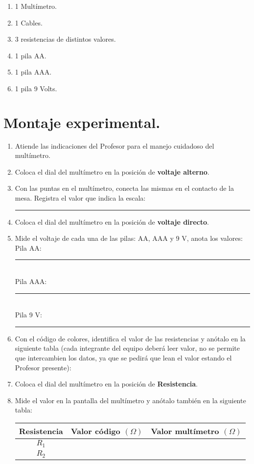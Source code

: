 \documentclass[14pt]{extarticle}
\begin{document}
\begin{enumerate}[label=\roman*)]
\item 1 Multímetro.
\item 1 Cables.
\item 3 resistencias de distintos valores.
\item 1 pila AA.
\item 1 pila AAA.
\item 1 pila 9 Volts.
\end{enumerate}

\section{Montaje experimental.}

\begin{enumerate}
\item Atiende las indicaciones del Profesor para el manejo cuidadoso del multímetro.
\item Coloca el dial del multímetro en la posición de \textbf{voltaje alterno}.
\item Con las puntas en el multímetro, conecta las mismas en el contacto de la mesa. Registra el valor que indica la escala: \rule{2cm}{0.1mm}
\item Coloca el dial del multímetro en la posición de \textbf{voltaje directo}.
\item Mide el voltaje de cada una de las pilas: AA, AAA y 9 V, anota los valores: \\
Pila AA: \rule{2cm}{0.1mm} \\
Pila AAA: \rule{2cm}{0.1mm} \\
Pila 9 V: \rule{2cm}{0.1mm}
\item Con el código de colores, identifica el valor de las resistencias y anótalo en la siguiente tabla (cada integrante del equipo deberá leer valor, no se permite que intercambien los datos, ya que se pedirá que lean el valor estando el Profesor presente):
\item Coloca el dial del multímetro en la posición de \textbf{Resistencia}.
\item Mide el valor en la pantalla del multímetro y anótalo también en la siguiente tabla:
\begin{table}[H]
\centering
\begin{tabular}{| c | c | c |} \hline
Resistencia & Valor código $(\Omega)$ & Valor multímetro $(\Omega)$ \\ \hline
$R_{1}$ & & \\ \hline
$R_{2}$ & & \\ \hline

\end{tabular}
\end{table}
\end{enumerate}
\end{document}
